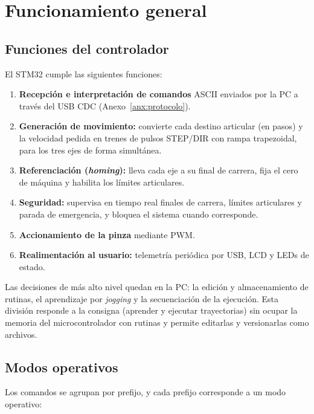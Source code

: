 \section{Funcionamiento general}\label{sec:funcionamiento}

\subsection{Funciones del controlador}
El STM32 cumple las siguientes funciones:
\begin{enumerate}
  \item \textbf{Recepción e interpretación de comandos} ASCII enviados por la PC a través del
        USB CDC (Anexo~\ref{anx:protocolo}).
  \item \textbf{Generación de movimiento:} convierte cada destino articular (en pasos) y la
        velocidad pedida en trenes de pulsos STEP/DIR con rampa trapezoidal, para los tres ejes
        de forma simultánea.
  \item \textbf{Referenciación (\emph{homing}):} lleva cada eje a su final de carrera, fija el
        cero de máquina y habilita los límites articulares.
  \item \textbf{Seguridad:} supervisa en tiempo real finales de carrera, límites articulares y
        parada de emergencia, y bloquea el sistema cuando corresponde.
  \item \textbf{Accionamiento de la pinza} mediante PWM.
  \item \textbf{Realimentación al usuario:} telemetría periódica por USB, LCD y LEDs de estado.
\end{enumerate}

Las decisiones de más alto nivel quedan en la PC: la edición y almacenamiento de rutinas,
el aprendizaje por \emph{jogging} y la secuenciación de la ejecución. Esta división
responde a la consigna (aprender y ejecutar trayectorias) sin ocupar la memoria del
microcontrolador con rutinas y permite editarlas y versionarlas como archivos.

\subsection{Modos operativos}
Los comandos se agrupan por prefijo, y cada prefijo corresponde a un modo operativo:

